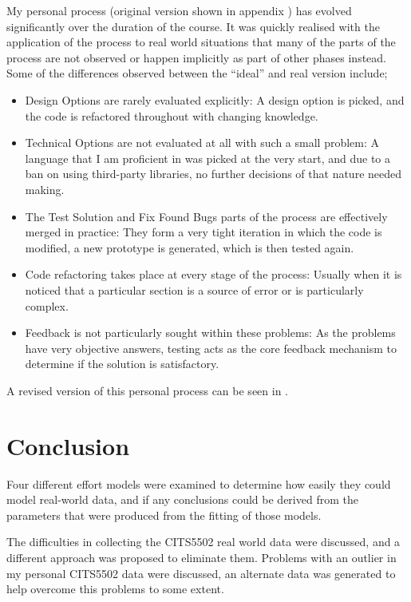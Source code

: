 \documentclass[a4paper,10pt]{article}
\begin{document}
My personal process (original version shown in appendix ) has evolved significantly over the duration of the course. It was quickly realised with the application of the process to real world situations that many of the parts of the process are not observed or happen implicitly as part of other phases instead. Some of the differences observed between the ``ideal'' and real version include;
\begin{itemize}
 \item Design Options are rarely evaluated explicitly: A design option is picked, and the code is refactored throughout with changing knowledge.
 \item Technical Options are not evaluated at all with such a small problem: A language that I am proficient in was picked at the very start, and due to a ban on using third-party libraries, no further decisions of that nature needed making.
 \item The Test Solution and Fix Found Bugs parts of the process are effectively merged in practice: They form a very tight iteration in which the code is modified, a new prototype is generated, which is then tested again.
 \item Code refactoring takes place at every stage of the process: Usually when it is noticed that a particular section is a source of error or is particularly complex.
 \item Feedback is not particularly sought within these problems: As the problems have very objective answers, testing acts as the core feedback mechanism to determine if the solution is satisfactory.
\end{itemize}

A revised version of this personal process can be seen in .


\section{Conclusion}
Four different effort models were examined to determine how easily they could model real-world data, and if any conclusions could be derived from the parameters that were produced from the fitting of those models.

The difficulties in collecting the CITS5502 real world data were discussed, and a different approach was proposed to eliminate them. Problems with an outlier in my personal CITS5502 data were discussed, an alternate data was generated to help overcome this problems to some extent.
\end{document}
